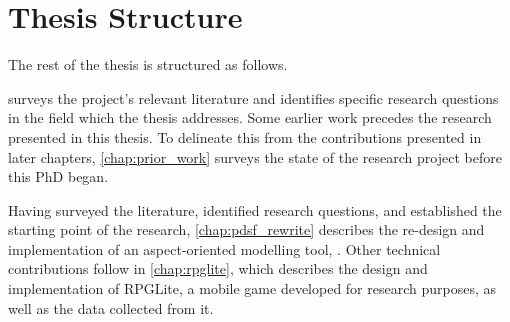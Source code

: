 






\section{Thesis Structure}

The rest of the thesis is structured as follows.

 surveys the project's relevant literature and identifies
specific research questions in the field which the thesis addresses. Some
earlier work precedes the research presented in this thesis. To delineate this
from the contributions presented in later chapters, \cref{chap:prior_work}
surveys the state of the research project before this PhD began.

Having surveyed the literature, identified research questions, and established
the starting point of the research, \cref{chap:pdsf_rewrite} describes the
re-design and implementation of an aspect-oriented modelling tool, \pdsf{}.
Other technical contributions follow in \cref{chap:rpglite}, which describes the
design and implementation of RPGLite, a mobile game developed for research
purposes, as well as the data collected from it.

